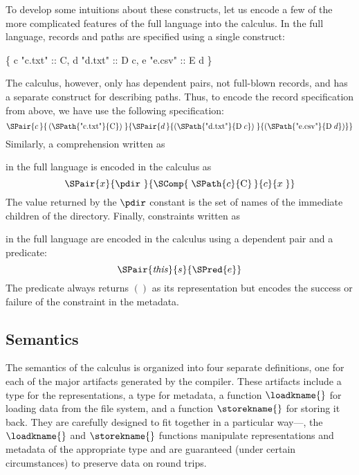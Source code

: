 To develop some intuitions about these constructs, let us encode a few
of the more complicated features of the full \forest{} language into
the calculus. In the full language, records and paths are specified
using a single construct:
%
\begin{centercode}
  \{ c  "c.txt" :: C, 
    d  "d.txt" :: D c, 
    e  "e.csv" :: E d \}
\end{centercode}
%
The calculus, however, only has dependent pairs, not full-blown
records, and has a separate construct for describing paths. Thus, to
encode the record specification from above, we have use the following
specification:
%
\[
\SPair{c\,}{\,(\SPath{\textrm{"}\mathrm{c.txt}\textrm{"}}{\mathrm{C}})\;}
           {\SPair{d\,}{(\SPath{\textrm{"}\mathrm{d.txt}\textrm{"}}{\mathrm{D}\; c})\;}
                       {(\SPath{\textrm{"}\mathrm{e.csv}\textrm{"}}{\mathrm{D}\; d})}} 
\]
%
Similarly, a comprehension written as
%
\begin{center}
\cd{[c :: C | c <- \kw{matches} (GL "*")]} 
\end{center}
%
in the full language is encoded in the calculus as
%
\[
\SPair{x}{\pdir~}{\SComp{\;\SPath{c}{\mathrm{C}}\,}{c}{x\;}}
\]
%
The value returned by the $\pdir$ constant is the set of names of the
immediate children of the directory. Finally, constraints written as
%
\begin{center}
\end{center}
%
in the full language are encoded in the calculus using a dependent
pair and a predicate: 
%
\[
\SPair{\mathit{this}}{s}{\SPred{e}}
\]
%
The predicate always returns $()$ as its representation but encodes
the success or failure of the constraint in the metadata.

\subsection{Semantics}
%
The semantics of the \forest{} calculus is organized into four
separate definitions, one for each of the major artifacts generated by
the compiler. These artifacts include a type for the representations,
a type for metadata, a function $\loadkname{}$ for loading data from the
file system, and a function $\storekname{}$ for storing it back. They are
carefully designed to fit together in a particular way---\eg, the
$\loadkname{}$ and $\storekname{}$ functions manipulate representations and
metadata of the appropriate type and are guaranteed (under certain
circumstances) to preserve data on round trips.

